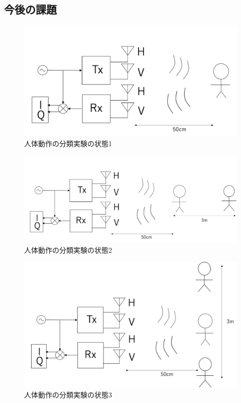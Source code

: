 \documentclass[uplatex,a4paper,12pt]{jsarticle}
\begin{document}
\subsection{今後の課題}
\begin{figure}[hbtp]
	\centering
	\includegraphics[scale=0.4]{../img/state1.png}
    \caption{人体動作の分類実験の状態1}
	\label{fig:state1}
\end{figure}
\begin{figure}[hbtp]
	\centering
	\includegraphics[scale=0.4]{../img/state2.png}
    \caption{人体動作の分類実験の状態2}
	\label{fig:state2}
\end{figure}
\begin{figure}[hbtp]
	\centering
	\includegraphics[scale=0.4]{../img/state3.png}
    \caption{人体動作の分類実験の状態3}
	\label{fig:state3}
\end{figure}
\end{document}
